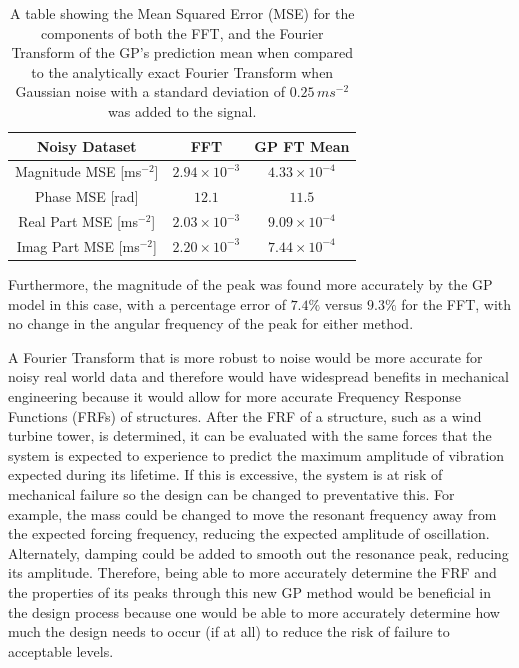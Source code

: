 \documentclass[12pt]{article}
\begin{document}
    \begin{table}[h]
        \centering %
        \setlength{\arrayrulewidth}{1pt} %
        \begin{tabular}{|c|c|c|} %
            \hline
            Noisy Dataset & FFT & GP FT Mean \\ %
            \hline
            Magnitude MSE [ms$^{-2}$] & $2.94 \times 10^{-3}$ & $4.33 \times 10^{-4}$ \\ %
            \hline
            Phase MSE [rad] & $12.1$ & $11.5$ \\ %
            \hline
            Real Part MSE [ms$^{-2}$] & $2.03 \times 10^{-3}$ & $9.09 \times 10^{-4}$ \\ %
            \hline
            Imag Part MSE [ms$^{-2}$] & $2.20 \times 10^{-3}$ & $7.44 \times 10^{-4}$ \\ %
            \hline
        \end{tabular}
        \caption{A table showing the Mean Squared Error (MSE) for the components of both the FFT, and the Fourier Transform of the GP's prediction mean when compared to the analytically exact Fourier Transform when Gaussian noise with a standard deviation of $0.25 \, ms^{-2}$ was added to the signal.}
        \label{tab:response-noise}
    \end{table}

    Furthermore, the magnitude of the peak was found more accurately by the GP model in this case, with a percentage error of $7.4\%$ versus $9.3\%$ for the FFT, with no change in the angular frequency of the peak for either method.

    A Fourier Transform that is more robust to noise would be more accurate for noisy real world data and therefore would have widespread benefits in mechanical engineering because it would allow for more accurate Frequency Response Functions (FRFs) of structures.
    After the FRF of a structure, such as a wind turbine tower, is determined, it can be evaluated with the same forces that the system is expected to experience to predict the maximum amplitude of vibration expected during its lifetime.
    If this is excessive, the system is at risk of mechanical failure so the design can be changed to preventative this.
    For example, the mass could be changed to move the resonant frequency away from the expected forcing frequency, reducing the expected amplitude of oscillation.
    Alternately, damping could be added to smooth out the resonance peak, reducing its amplitude.
    Therefore, being able to more accurately determine the FRF and the properties of its peaks through this new GP method would be beneficial in the design process because one would be able to more accurately determine how much the design needs to occur (if at all) to reduce the risk of failure to acceptable levels.
\end{document}

